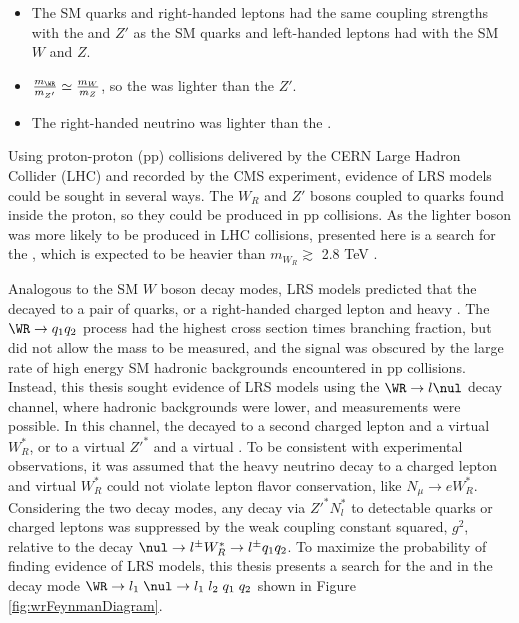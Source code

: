 \begin{itemize}
	\item The SM quarks and right-handed leptons had the same coupling strengths with the \WR and $Z'$ 
		as the SM quarks and left-handed leptons had with the SM $W$ and $Z$.
	\item $\frac{m_{\WR}}{m_{Z'}} \simeq \frac{m_{W}}{m_{Z}}$, so the \WR was lighter than the $Z'$.
	\item The right-handed neutrino \nul was lighter than the \WR.
\end{itemize}

Using proton-proton (pp) collisions delivered by the CERN Large Hadron Collider (LHC) and recorded 
by the CMS experiment, evidence of LRS models could be sought in several ways.  The $W_{R}$ and $Z'$ 
bosons coupled to quarks found inside the proton, so they 
could be produced in pp collisions.  As the lighter boson was more likely to be 
produced in LHC collisions, presented here is a search for the \WR, which is expected to be heavier than 
$m_{W_{R}} \gtrsim$ 2.8 TeV \cite{cmsWRRunOneResults}.

Analogous to the SM $W$ boson decay modes, LRS models predicted that the \WR 
decayed to a pair of quarks, or a right-handed charged lepton and heavy \nul.  The $\WR \rightarrow q_{1}q_{2}$ 
process had the highest cross section times branching fraction, but did not allow the mass 
\mnul to be measured, and the \WR signal was obscured by the large rate of high energy SM hadronic 
backgrounds encountered in pp collisions.  Instead, this thesis sought evidence of LRS models using 
the $\WR \rightarrow l\nul$ decay channel, where hadronic backgrounds were lower, and \mnul measurements 
were possible.  In this channel, the \nul decayed to a second charged 
lepton and a virtual $W^{*}_{R}$, or to a virtual $Z'^{*}$ and a virtual \nul.  To 
be consistent with experimental observations, it was assumed that the heavy neutrino decay to a charged lepton and 
virtual $W^{*}_{R}$ could not violate lepton flavor conservation, like $N_{\mu} \rightarrow eW^{*}_{R}$.  
Considering the two \nul decay modes, any \nul decay via $Z'^{*}N^{*}_{l}$ to detectable quarks or 
charged leptons was suppressed by the weak coupling constant squared, $g^{2}$, relative to 
the decay $\nul \rightarrow l^{\pm}W^{*}_{R} \rightarrow l^{\pm}q_{1}q_{2}$.  To maximize 
the probability of finding evidence of LRS models, this thesis presents a search 
for the \WR and \nul in the decay mode $\WR \rightarrow l_{1}\thickspace \nul \rightarrow 
l_{1}\thickspace l_{2}\thickspace q_{1}\thickspace q_{2}$ shown in Figure \ref{fig:wrFeynmanDiagram}.


